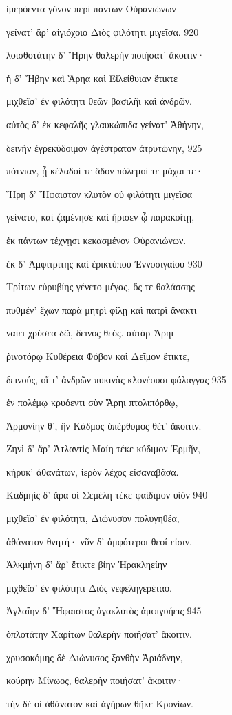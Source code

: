 ἱμερόεντα γόνον περὶ πάντων Οὐρανιώνων

γείνατ' ἄρ' αἰγιόχοιο Διὸς φιλότητι μιγεῖσα. 920

λοισθοτάτην δ' Ἥρην θαλερὴν ποιήσατ' ἄκοιτιν· 

ἡ δ' Ἥβην καὶ Ἄρηα καὶ Εἰλείθυιαν ἔτικτε 

μιχθεῖσ' ἐν φιλότητι θεῶν βασιλῆι καὶ ἀνδρῶν. 

αὐτὸς δ' ἐκ κεφαλῆς γλαυκώπιδα γείνατ' Ἀθήνην, 

δεινὴν ἐγρεκύδοιμον ἀγέστρατον ἀτρυτώνην, 925 

πότνιαν, ᾗ κέλαδοί τε ἅδον πόλεμοί τε μάχαι τε· 

Ἥρη δ' Ἥφαιστον κλυτὸν οὐ φιλότητι μιγεῖσα

γείνατο, καὶ ζαμένησε καὶ ἤρισεν ᾧ παρακοίτῃ,

ἐκ πάντων τέχνῃσι κεκασμένον Οὐρανιώνων.

ἐκ δ' Ἀμφιτρίτης καὶ ἐρικτύπου Ἐννοσιγαίου 930

Τρίτων εὐρυβίης γένετο μέγας, ὅς τε θαλάσσης 

πυθμέν' ἔχων παρὰ μητρὶ φίλῃ καὶ πατρὶ ἄνακτι

ναίει χρύσεα δῶ, δεινὸς θεός. αὐτὰρ Ἄρηι

ῥινοτόρῳ Κυθέρεια Φόβον καὶ Δεῖμον ἔτικτε, 

δεινούς, οἵ τ' ἀνδρῶν πυκινὰς κλονέουσι φάλαγγας 935

ἐν πολέμῳ κρυόεντι σὺν Ἄρηι πτολιπόρθῳ,

Ἁρμονίην θ', ἣν Κάδμος ὑπέρθυμος θέτ' ἄκοιτιν. 

Ζηνὶ δ' ἄρ' Ἀτλαντὶς Μαίη τέκε κύδιμον Ἑρμῆν,

κήρυκ' ἀθανάτων, ἱερὸν λέχος εἰσαναβᾶσα.

Καδμηὶς δ' ἄρα οἱ Σεμέλη τέκε φαίδιμον υἱὸν 940 

μιχθεῖσ' ἐν φιλότητι, Διώνυσον πολυγηθέα, 

ἀθάνατον θνητή· νῦν δ' ἀμφότεροι θεοί εἰσιν. 

Ἀλκμήνη δ' ἄρ' ἔτικτε βίην Ἡρακληείην

μιχθεῖσ' ἐν φιλότητι Διὸς νεφεληγερέταο. 

Ἀγλαΐην δ' Ἥφαιστος ἀγακλυτὸς ἀμφιγυήεις 945 

ὁπλοτάτην Χαρίτων θαλερὴν ποιήσατ' ἄκοιτιν.

χρυσοκόμης δὲ Διώνυσος ξανθὴν Ἀριάδνην,

κούρην Μίνωος, θαλερὴν ποιήσατ' ἄκοιτιν· 

τὴν δέ οἱ ἀθάνατον καὶ ἀγήρων θῆκε Κρονίων.

